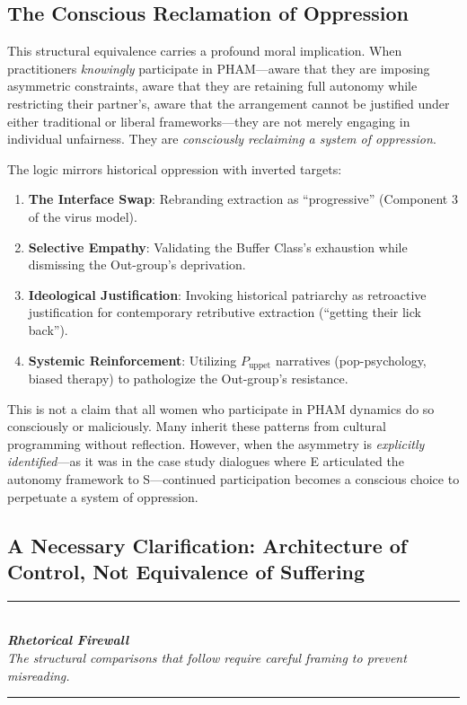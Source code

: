 \documentclass[12pt,openany]{book}
\numberwithin{equation}{chapter}
\begin{document}
\subsection{The Conscious Reclamation of Oppression}

This structural equivalence carries a profound moral implication. When practitioners \textit{knowingly} participate in PHAM---aware that they are imposing asymmetric constraints, aware that they are retaining full autonomy while restricting their partner's, aware that the arrangement cannot be justified under either traditional or liberal frameworks---they are not merely engaging in individual unfairness. They are \textit{consciously reclaiming a system of oppression}.

The logic mirrors historical oppression with inverted targets:
\begin{enumerate}
    \item \textbf{The Interface Swap}: Rebranding extraction as ``progressive'' (Component 3 of the virus model).
    \item \textbf{Selective Empathy}: Validating the Buffer Class's exhaustion while dismissing the Out-group's deprivation.
    \item \textbf{Ideological Justification}: Invoking historical patriarchy as retroactive justification for contemporary retributive extraction (``getting their lick back'').
    \item \textbf{Systemic Reinforcement}: Utilizing $P_{\text{uppet}}$ narratives (pop-psychology, biased therapy) to pathologize the Out-group's resistance.
\end{enumerate}

This is not a claim that all women who participate in PHAM dynamics do so consciously or maliciously. Many inherit these patterns from cultural programming without reflection. However, when the asymmetry is \textit{explicitly identified}---as it was in the case study dialogues where E articulated the autonomy framework to S---continued participation becomes a conscious choice to perpetuate a system of oppression.

\subsection{A Necessary Clarification: Architecture of Control, Not Equivalence of Suffering}

\begin{center}
\rule{0.6\textwidth}{0.4pt}\\[0.5em]
\textit{\textbf{Rhetorical Firewall}}\\[0.3em]
\textit{The structural comparisons that follow require careful framing to prevent misreading.}\\[0.5em]
\rule{0.6\textwidth}{0.4pt}
\end{center}
\end{document}
